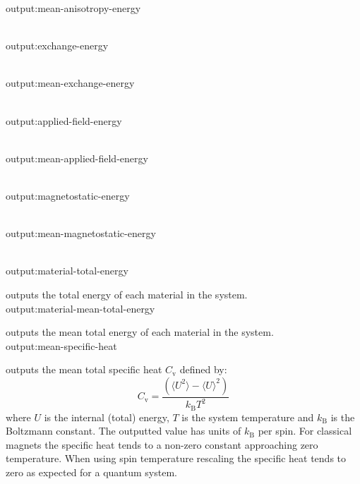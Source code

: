 {\zicf output:mean-anisotropy-energy}\\

{\zicf output:exchange-energy}\\

{\zicf output:mean-exchange-energy}\\

{\zicf output:applied-field-energy}\\

{\zicf output:mean-applied-field-energy}\\

{\zicf output:magnetostatic-energy}\\

{\zicf output:mean-magnetostatic-energy}\\

{\zicf output:material-total-energy} outputs
the total energy of each material in the system.\\

{\zicf output:material-mean-total-energy} outputs
the mean total energy of each material in the system.\\

{\zicf output:mean-specific-heat} outputs the mean
total specific heat $C_{\mathrm{v}}$ defined by:
\begin{equation*}
C_{\mathrm{v}} = \frac{\left(\langle U^2 \rangle - \langle U \rangle^2 \right)}{k_{\mathrm{B}} T^2}
\end{equation*}
where $U$ is the internal (total) energy, $T$ is the system temperature and $k_{\mathrm{B}}$ is the Boltzmann
constant. The outputted value has units of $k_{\mathrm{B}}$ per spin. For classical magnets the specific heat
tends to a non-zero constant approaching zero temperature. When using spin temperature rescaling the specific
heat tends to zero as expected for a quantum system.\\

